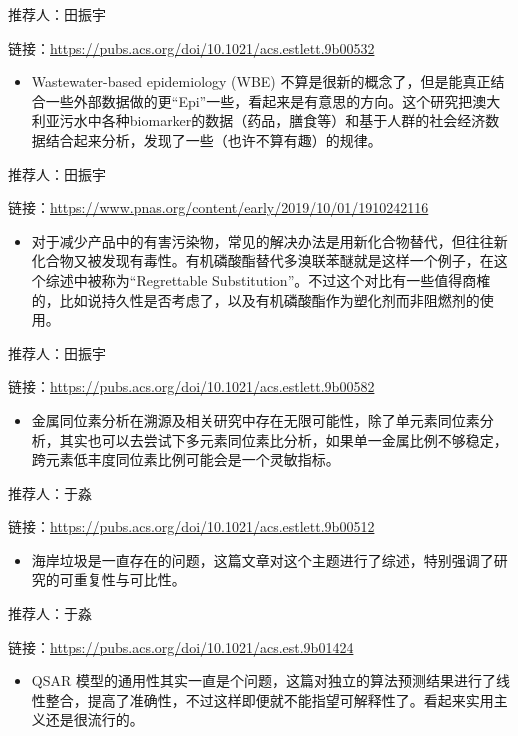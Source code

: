 \documentclass[]{book}
\providecommand{\tightlist}{%
  \setlength{\itemsep}{0pt}\setlength{\parskip}{0pt}}
\begin{document}
推荐人：田振宇

链接：\url{https://pubs.acs.org/doi/10.1021/acs.estlett.9b00532}

\begin{itemize}
\tightlist
\item
  Wastewater-based epidemiology (WBE) 不算是很新的概念了，但是能真正结合一些外部数据做的更``Epi''一些，看起来是有意思的方向。这个研究把澳大利亚污水中各种biomarker的数据（药品，膳食等）和基于人群的社会经济数据结合起来分析，发现了一些（也许不算有趣）的规律。
\end{itemize}

推荐人：田振宇

链接：\url{https://www.pnas.org/content/early/2019/10/01/1910242116}

\begin{itemize}
\tightlist
\item
  对于减少产品中的有害污染物，常见的解决办法是用新化合物替代，但往往新化合物又被发现有毒性。有机磷酸酯替代多溴联苯醚就是这样一个例子，在这个综述中被称为``Regrettable Substitution''。不过这个对比有一些值得商榷的，比如说持久性是否考虑了，以及有机磷酸酯作为塑化剂而非阻燃剂的使用。
\end{itemize}

推荐人：田振宇

链接：\url{https://pubs.acs.org/doi/10.1021/acs.estlett.9b00582}

\begin{itemize}
\tightlist
\item
  金属同位素分析在溯源及相关研究中存在无限可能性，除了单元素同位素分析，其实也可以去尝试下多元素同位素比分析，如果单一金属比例不够稳定，跨元素低丰度同位素比例可能会是一个灵敏指标。
\end{itemize}

推荐人：于淼

链接：\url{https://pubs.acs.org/doi/10.1021/acs.estlett.9b00512}

\begin{itemize}
\tightlist
\item
  海岸垃圾是一直存在的问题，这篇文章对这个主题进行了综述，特别强调了研究的可重复性与可比性。
\end{itemize}

推荐人：于淼

链接：\url{https://pubs.acs.org/doi/10.1021/acs.est.9b01424}

\begin{itemize}
\tightlist
\item
  QSAR 模型的通用性其实一直是个问题，这篇对独立的算法预测结果进行了线性整合，提高了准确性，不过这样即便就不能指望可解释性了。看起来实用主义还是很流行的。
\end{itemize}
\end{document}
